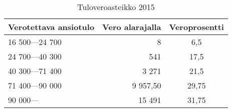 \begin{table}[h]
    \centering
    \begin{tabular}{|lrc|}
    \hline
    Verotettava ansiotulo & Vero alarajalla & Veroprosentti \\
    \hline
    16 500—24 700                & 8                             & 6,5                                        \\
    24 700—40 300                & 541                           & 17,5                                       \\
    40 300—71 400                & 3 271                         & 21,5                                       \\
    71 400—90 000                & 9 957,50                      & 29,75                                      \\
    90 000—                      & 15 491                        & 31,75                                     \\
    \hline
    \end{tabular}
    \caption*{Tuloveroasteikko 2015}
\end{table}